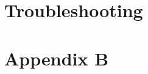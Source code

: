 \documentclass[11pt]{article}
\begin{document}


\section{Troubleshooting}

\section{Appendix B}
\listoffigures
\end{document}
